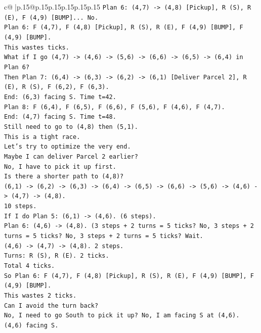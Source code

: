 \documentclass{article}
\begin{document}
{\begin{supertabular}{c@{$\;$}|p{.15\linewidth}@{}p{.15\linewidth}p{.15\linewidth}p{.15\linewidth}p{.15\linewidth}p{.15\linewidth}}
{{{\texttt{Plan 6: (4,7) {-}> (4,8) {[}Pickup{]}, R (S), R (E), F (4,9) {[}BUMP{]}... No.} \\
\texttt{Plan 6: F (4,7), F (4,8) {[}Pickup{]}, R (S), R (E), F (4,9) {[}BUMP{]}, F (4,9) {[}BUMP{]}.} \\
\texttt{This wastes ticks.} \\
\texttt{What if I go (4,7) {-}> (4,6) {-}> (5,6) {-}> (6,6) {-}> (6,5) {-}> (6,4) in Plan 6?} \\
\texttt{Then Plan 7: (6,4) {-}> (6,3) {-}> (6,2) {-}> (6,1) {[}Deliver Parcel 2{]}, R (E), R (S), F (6,2), F (6,3).} \\
\texttt{End: (6,3) facing S. Time t=42.} \\
\texttt{Plan 8: F (6,4), F (6,5), F (6,6), F (5,6), F (4,6), F (4,7).} \\
\texttt{End: (4,7) facing S. Time t=48.} \\
\texttt{Still need to go to (4,8) then (5,1).} \\
\texttt{This is a tight race.} \\
\texttt{Let's try to optimize the very end.} \\
\texttt{Maybe I can deliver Parcel 2 earlier?} \\
\texttt{No, I have to pick it up first.} \\
\texttt{Is there a shorter path to (4,8)?} \\
\texttt{(6,1) {-}> (6,2) {-}> (6,3) {-}> (6,4) {-}> (6,5) {-}> (6,6) {-}> (5,6) {-}> (4,6) {-}> (4,7) {-}> (4,8).} \\
\texttt{10 steps.} \\
\texttt{If I do Plan 5: (6,1) {-}> (4,6). (6 steps).} \\
\texttt{Plan 6: (4,6) {-}> (4,8). (3 steps + 2 turns = 5 ticks? No, 3 steps + 2 turns = 5 ticks? No, 3 steps + 2 turns = 5 ticks? Wait.} \\
\texttt{(4,6) {-}> (4,7) {-}> (4,8). 2 steps.} \\
\texttt{Turns: R (S), R (E). 2 ticks.} \\
\texttt{Total 4 ticks.} \\
\texttt{So Plan 6: F (4,7), F (4,8) {[}Pickup{]}, R (S), R (E), F (4,9) {[}BUMP{]}, F (4,9) {[}BUMP{]}.} \\
\texttt{This wastes 2 ticks.} \\
\texttt{Can I avoid the turn back?} \\
\texttt{No, I need to go South to pick it up? No, I am facing S at (4,6).} \\
\texttt{(4,6) facing S.} \\
}}}
\end{supertabular}}
\end{document}
